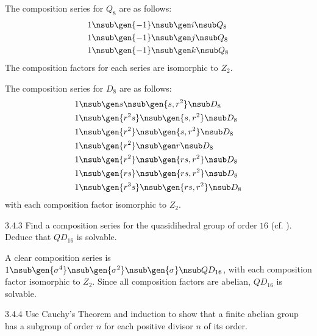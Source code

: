 \begin{sol}
    The composition series for $Q_8$ are as follows:
    \begin{align*}
        1 & \nsub \gen{-1} \nsub \gen i \nsub Q_8 \\
        1 & \nsub \gen{-1} \nsub \gen j \nsub Q_8 \\
        1 & \nsub \gen{-1} \nsub \gen k \nsub Q_8
    \end{align*}
    The composition factors for each series are isomorphic to $Z_2$.

    The composition series for $D_8$ are as follows:
    \begin{align*}
        1 & \nsub \gen s \nsub \gen{s, r^2} \nsub D_8 \\
        1 & \nsub \gen{r^2s} \nsub \gen{s, r^2} \nsub D_8 \\
        1 & \nsub \gen{r^2} \nsub \gen{s, r^2} \nsub D_8 \\
        1 & \nsub \gen{r^2} \nsub \gen r \nsub D_8 \\
        1 & \nsub \gen{r^2} \nsub \gen{rs, r^2} \nsub D_8 \\
        1 & \nsub \gen{rs} \nsub \gen{rs, r^2} \nsub D_8 \\
        1 & \nsub \gen{r^3s} \nsub \gen{rs, r^2} \nsub D_8
    \end{align*}
    with each composition factor isomorphic to $Z_2$.
\end{sol}

\begin{exercise}{3.4.3}
    Find a composition series for the quasidihedral group of order $16$ (cf. ).
	Deduce that $QD_{16}$ is solvable.
\end{exercise}

\begin{sol}
    A clear composition series is $1 \nsub \gen{\sigma^4} \nsub \gen{\sigma^2} \nsub \gen{\sigma} \nsub QD_{16}$, with each composition factor isomorphic to $Z_2$.
	Since all composition factors are abelian, $QD_{16}$ is solvable.
\end{sol}

\begin{exercise}{3.4.4}
    Use Cauchy's Theorem and induction to show that a finite abelian group has a subgroup of order $n$ for each positive divisor $n$ of its order.
\end{exercise}

